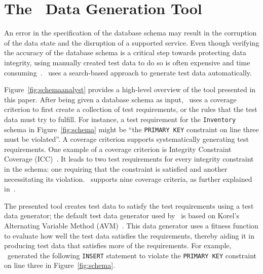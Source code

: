 \section{The \sa~Data Generation Tool}\label{sec:technique}


An error in the specification of the database schema may result in the corruption of the data state and the disruption
of a supported service.  Even though verifying the accuracy of the database schema is a critical step towards protecting
data integrity, using manually created test data to do so is often expensive and time
consuming~\cite{kapfhammer2013search}.  \sa~uses a search-based approach to generate test data automatically.


Figure~\ref{fig:schemaanalyst} provides a high-level overview of the tool presented in this paper.  After being given a
database schema as input, \sa~uses a coverage criterion to first create a collection of test requirements, or the
rules that the test data must try to fulfill.  For instance, a test requirement for the \texttt{Inventory} schema in
Figure~\ref{fig:schema} might be ``the \texttt{PRIMARY KEY} constraint on line three must be violated''. A coverage
criterion supports systematically generating test requirements.  One example of a coverage criterion is Integrity
Constraint Coverage (ICC)~\cite{mcminn2015effectiveness}. It leads to two test requirements for every integrity
constraint in the schema: one requiring that the constraint is satisfied and another necessitating its violation.
\sa~supports nine coverage criteria, as further explained in~\cite{mcminn2015effectiveness}.


The presented tool creates test data to satisfy the test requirements using a test data generator; the default test data
generator used by \sa~is based on Korel's Alternating Variable Method (AVM)~\cite{Korel:AVM}. This data generator uses a
fitness function to evaluate how well the test data satisfies the requirements, thereby aiding it in producing test data
that satisfies more of the requirements. For example, \sa~generated the following \texttt{INSERT} statement to violate
the \texttt{PRIMARY KEY} constraint on line three in Figure~\ref{fig:schema}.

